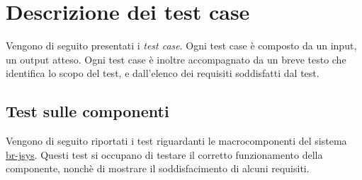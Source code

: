 \chapter{Descrizione dei test case}
Vengono di seguito presentati i \textit{test case}. Ogni test case \`e composto da un input, un output atteso. Ogni test case \`e inoltre accompagnato da un breve testo che identifica lo scopo del test, e dall'elenco dei requisiti soddisfatti dal test.

\section{Test sulle componenti}
Vengono di seguito riportati i test riguardanti le macrocomponenti del sistema \underline{br-jsys}. Questi test si occupano di testare il corretto funzionamento della componente, nonch\`e di mostrare il soddisfacimento di alcuni requisiti.

